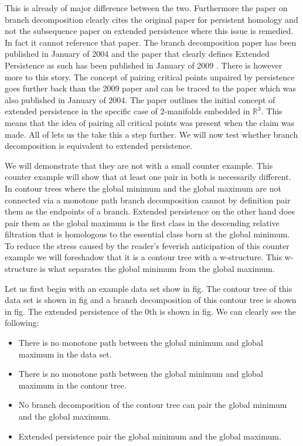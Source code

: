 This is already of major difference between the two. Furthermore the paper on branch decomposition clearly cites the original paper for persistent homology and not the subsequence paper on extended persistence where this issue is remedied. In fact it cannot reference that paper. The branch decomposition paper has been published in January of 2004 and the paper that clearly defines Extended Persistence as such has been published in January of 2009 \cite{persistence-extended}. There is however more to this story. The concept of pairing critical points unpaired by persistence goes further back than the 2009 paper and can be traced to the paper \cite{extreme-elevation} which was also published in January of 2004. The paper outlines the initial concept of extended persistence in the specific case of 2-manifolds embedded in $\mathbb{R}^3$. This means that the idea of pairing all critical points was present when the claim was made. All of lets us the take this a step further. We will now test whether branch decomposition is equivalent to extended persistence.

We will demonstrate that they are not with a small counter example. This counter example will show that at least one pair in both is necessarily different. In contour trees where the global minimum and the global maximum are not connected via a monotone path branch decomposition cannot by definition pair them as the endpoints of a branch. Extended persistence on the other hand does pair them as the global maximum is the first class in the descending relative filtration that is homologous to the essential class born at the global minimum. To reduce the stress caused by the reader's feverish anticipation of this counter example we will foreshadow that it is a contour tree with a w-structure. This w-structure is what separates the global minimum from the global maximum.

Let us first begin with an example data set show in fig. The contour tree of this data set is shown in fig and a branch decomposition of this contour tree is shown in fig. The extended persistence of the 0th is shown in fig. We can clearly see the following:

\begin{itemize}
    \item There is no monotone path between the global minimum and global maximum in the data set.
    \item There is no monotone path between the global minimum and global maximum in the contour tree.
    \item No branch decomposition of the contour tree can pair the global minimum and the global maximum.
    \item Extended persistence pair the global minimum and the global maximum.
\end{itemize}

